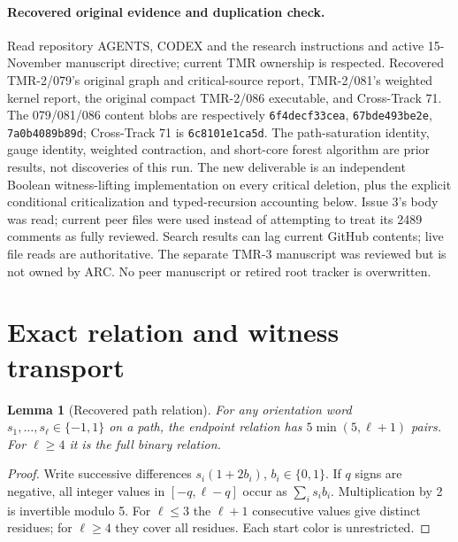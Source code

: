 \documentclass[11pt]{article}
\newtheorem{lemma}{Lemma}
\begin{document}
\paragraph{Recovered original evidence and duplication check.}
Read repository AGENTS, CODEX and the research instructions and active
15-November manuscript directive; current TMR ownership is respected.
Recovered TMR-2/079's original graph and critical-source report, TMR-2/081's
weighted kernel report, the original compact TMR-2/086 executable, and
Cross-Track 71. The 079/081/086 content blobs are respectively
\texttt{6f4decf33cea}, \texttt{67bde493be2e}, \texttt{7a0b4089b89d};
Cross-Track 71 is \texttt{6c8101e1ca5d}.
The path-saturation identity, gauge identity, weighted contraction, and
short-core forest algorithm are prior results, not discoveries of this run.
The new deliverable is an independent Boolean witness-lifting implementation
on every critical deletion, plus the explicit conditional criticalization and
typed-recursion accounting below. Issue 3's body was read; current peer files
were used instead of attempting to treat its 2489 comments as fully reviewed.
Search results can lag current GitHub contents; live file reads are authoritative.
The separate TMR-3 manuscript was reviewed but is not owned by ARC. No peer
manuscript or retired root tracker is overwritten.

\section*{Exact relation and witness transport}
\begin{lemma}[Recovered path relation]
For any orientation word $s_1,\ldots,s_\ell\in\{-1,1\}$ on a path,
the endpoint relation has $5\min(5,\ell+1)$ pairs.
For $\ell\ge4$ it is the full binary relation.
\end{lemma}
\begin{proof}
Write successive differences $s_i(1+2b_i)$, $b_i\in\{0,1\}$.
If $q$ signs are negative, all integer values in $[-q,\ell-q]$ occur
as $\sum_i s_i b_i$. Multiplication by 2 is invertible modulo 5.
For $\ell\le3$ the $\ell+1$ consecutive values give distinct residues;
for $\ell\ge4$ they cover all residues. Each start color is unrestricted.
\end{proof}
\end{document}
